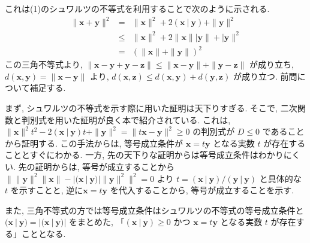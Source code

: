 \begin{fsprob}
{これは(1)のシュワルツの不等式を利用することで次のように示される.
\begin{eqnarray*}
    \|\bm{x} + \bm{y}\|^2 &=& \|\bm{x}\|^2 + 2(\bm{x}\ |\ \bm{y}) + \|\bm{y}\|^2\\
    &\leq& \|\bm{x}\|^2 + 2\|\bm{x}\||\bm{y}\| + |\bm{y}\|^2\\
    &=& (\|\bm{x}\| + \|\bm{y}\|)^2
\end{eqnarray*}
この三角不等式より, $\|\bm{x} - \bm{y} + \bm{y} - \bm{z}\| \leq \|\bm{x} -\bm{y}\| + \|\bm{y} - \bm{z}\|$ が成り立ち, $d(\bm{x}, \bm{y}) = \|\bm{x} - \bm{y}\|$ より, 
$d(\bm{x}, \bm{z}) \leq d(\bm{x}, \bm{y}) + d(\bm{y}, \bm{z})$ が成り立つ.
}
\newpage
前問について補足する.

まず, シュワルツの不等式を示す際に用いた証明は天下りすぎる. そこで, 二次関数と判別式を用いた証明が良く本で紹介されている.
これは, $\|\bm{x}\|^2t^2 - 2(\bm{x}\ |\ \bm{y})t + \|\bm{y}\|^2 = \| t\bm{x} - \bm{y}\|^2 \geq 0$ の判別式が $D \leq 0$ であることから証明する.
この手法からは, 等号成立条件が $\bm{x} = t\bm{y}$ となる実数 $t$ が存在することとすぐにわかる. 一方, 先の天下りな証明からは等号成立条件はわかりにくい.
先の証明からは, 等号が成立することから $\| \|\bm{y}\|^2\|\bm{x}\| - |(\bm{x}\ |\ \bm{y})| \|\bm{y}\|^2 \|^2 = 0$ より $t = (\bm{x}\ |\ \bm{y})/(\bm{y}\ |\ \bm{y})$ と具体的な $t$ を示すことと, 
逆に$\bm{x} = t\bm{y}$ を代入することから, 等号が成立することを示す. 

また, 三角不等式の方では等号成立条件はシュワルツの不等式の等号成立条件と $(\bm{x}\ |\ \bm{y}) = |(\bm{x}\ |\ \bm{y})|$ をまとめた, 
「$(\bm{x}\ |\ \bm{y}) \geq 0$ かつ $\bm{x} = t\bm{y}$ となる実数 $t$ が存在する」こととなる.
\end{fsprob}



